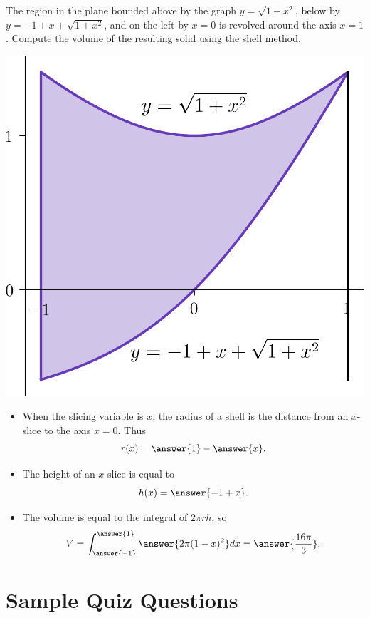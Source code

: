 \documentclass{ximera}
\begin{document}
\begin{exercise}
The region in the plane bounded above by the graph $y = \sqrt{1+x^2}$, below by $y = -1 + x + \sqrt{1+x^2}$, and on the left by $x = 0$ is revolved around the axis $x = 1$. Compute the volume of the resulting solid using the shell method.
\begin{center}
\begin{image}
\includegraphics{shell/shell04.png}
\end{image}
\end{center}
\begin{itemize}
\item When the slicing variable is $x$, the radius of a shell is the  distance from an $x$-slice to the axis $x = 0$. Thus
\[ r(x) = \answer{1} - \answer{x}. \]
\item The height of an $x$-slice is equal to
\[ h(x) = \answer{-1+x}. \]
\item The volume is equal to the integral of $2 \pi r h$, so 
\[ V = \int_{\answer{-1}}^{\answer{1}} \answer{2 \pi (1-x)^2 } dx = \answer{\frac{16\pi}{3}}. \]
\end{itemize}
\end{exercise}


\section*{Sample Quiz Questions}
\end{document}
